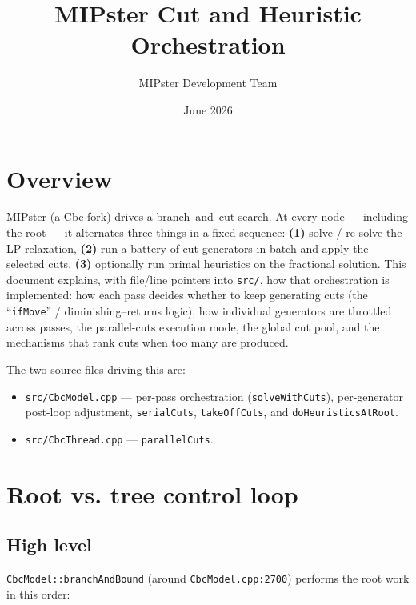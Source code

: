 \documentclass[11pt,a4paper]{article}
\title{MIPster Cut and Heuristic Orchestration}
\author{MIPster Development Team}
\date{June 2026}
\begin{document}
\maketitle
\tableofcontents
\newpage

\section{Overview}

MIPster (a Cbc fork) drives a branch--and--cut search.  At every node
--- including the root --- it alternates three things in a fixed
sequence: \textbf{(1)} solve / re-solve the LP relaxation,
\textbf{(2)} run a battery of cut generators in batch and apply the
selected cuts, \textbf{(3)} optionally run primal heuristics on the
fractional solution.  This document explains, with file/line
pointers into \texttt{src/}, how that orchestration is implemented:
how each pass decides whether to keep generating cuts (the
``\texttt{ifMove}'' / diminishing--returns logic), how individual
generators are throttled across passes, the parallel-cuts execution
mode, the global cut pool, and the mechanisms that rank cuts when
too many are produced.

The two source files driving this are:
\begin{itemize}[leftmargin=*]
  \item \texttt{src/CbcModel.cpp} --- per-pass orchestration
        (\texttt{solveWithCuts}), per-generator post-loop adjustment,
        \texttt{serialCuts}, \texttt{takeOffCuts}, and
        \texttt{doHeuristicsAtRoot}.
  \item \texttt{src/CbcThread.cpp} --- \texttt{parallelCuts}.
\end{itemize}

\section{Root vs. tree control loop}
\label{sec:rootloop}

\subsection*{High level}

\texttt{CbcModel::branchAndBound} (around \texttt{CbcModel.cpp:2700})
performs the root work in this order:
\end{document}

